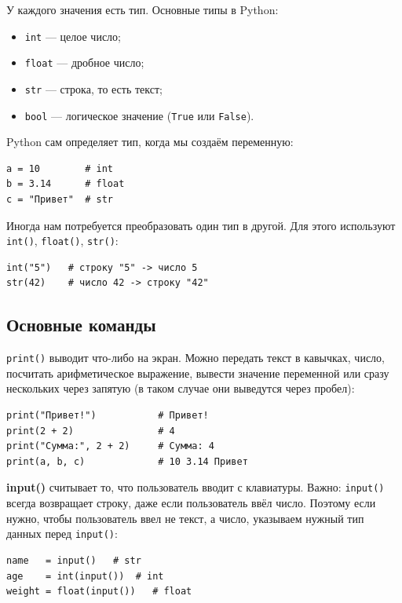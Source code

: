 \documentclass[12pt,a4paper]{article}
\begin{document}
У каждого значения есть тип. Основные типы в Python:
\begin{itemize}
    \item \texttt{int} --- целое число;
    \item \texttt{float} --- дробное число;
    \item \texttt{str} --- строка, то есть текст;
    \item \texttt{bool} --- логическое значение (\texttt{True} или \texttt{False}).
\end{itemize}
\smallskip

Python сам определяет тип, когда мы создаём переменную:
\begin{verbatim}
a = 10        # int
b = 3.14      # float
c = "Привет"  # str
\end{verbatim}
\smallskip

Иногда нам потребуется преобразовать один тип в другой. Для этого используют \texttt{int()}, \texttt{float()}, \texttt{str()}:

\begin{verbatim}
int("5")   # строку "5" -> число 5
str(42)    # число 42 -> строку "42"
\end{verbatim}

\subsection*{Основные команды}

\texttt{print()} выводит что-либо на экран. Можно передать текст в кавычках, число, посчитать арифметическое выражение, вывести значение переменной или сразу нескольких через запятую (в таком случае они выведутся через пробел):

\begin{verbatim}
print("Привет!")           # Привет!
print(2 + 2)               # 4
print("Сумма:", 2 + 2)     # Сумма: 4
print(a, b, c)             # 10 3.14 Привет
\end{verbatim}

\textbf{input()} считывает то, что пользователь вводит с клавиатуры. Важно: \texttt{input()} всегда возвращает строку, даже если пользователь ввёл число. Поэтому если нужно, чтобы пользователь ввел не текст, а число, указываем нужный тип данных перед \texttt{input()}:

\begin{verbatim}
name   = input()   # str
age    = int(input())  # int
weight = float(input())   # float
\end{verbatim}
\end{document}

